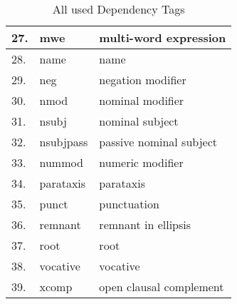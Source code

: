 \begin{table}[h]
\begin{tabular}{| l | l | l |}
27. &  mwe  & multi-word expression \\ \hline
28. &  name  & name \\ \hline
29. & 	neg  & negation modifier \\ \hline
30. & 	nmod  & nominal modifier \\ \hline
31. & 	nsubj  & nominal subject \\ \hline
32. & 	nsubjpass  & passive nominal subject \\ \hline
33. & nummod  & numeric modifier \\ \hline
34. & 	parataxis  & parataxis  \\ \hline
35. & 	punct  & punctuation  \\ \hline
36. &  remnant  & remnant in ellipsis  \\ \hline
37. &  root  & root  \\ \hline
38. & 	vocative  & vocative  \\ \hline
39. & 	xcomp  & open clausal complement  \\ \hline
    \end{tabular}
      \caption{All used Dependency Tags}
     \label{table:AllDependencyTags}
\end{table}